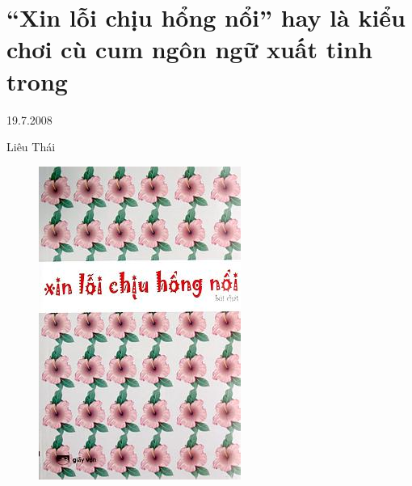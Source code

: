 \documentclass[../main.tex]{subfiles}
\begin{document}
\chapter{“Xin lỗi chịu hổng nổi” hay là kiểu chơi cù cum ngôn ngữ xuất tinh trong}

\begin{metadata}

\begin{flushright}19.7.2008\end{flushright}

Liêu Thái



\end{metadata}

\begin{multicols}{2}

\begin{figure}
	\centering
	\includegraphics[width=\textwidth]{../img/tho190708.jpg}

\end{figure}
\end{multicols}
\end{document}
